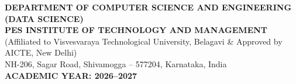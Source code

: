 \begin{titlepage}
\begin{center}
\vspace{0.3cm}
\textbf{\large DEPARTMENT OF COMPUTER SCIENCE AND ENGINEERING (DATA SCIENCE)}\\
\textbf{\large PES INSTITUTE OF TECHNOLOGY AND MANAGEMENT}\\
{\small (Affiliated to Visvesvaraya Technological University, Belagavi \& Approved by AICTE, New Delhi)}\\
{\small NH-206, Sagar Road, Shivamogga -- 577204, Karnataka, India}\\
\textbf{ACADEMIC YEAR: 2026--2027}

\end{center}
\end{titlepage}
